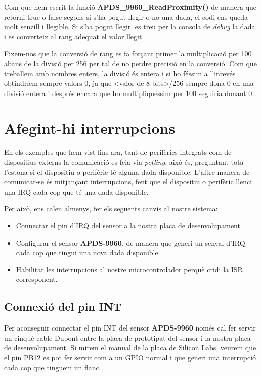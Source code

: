 Com que hem escrit la funció {\bf APDS\_9960\_ReadProximity()} de manera que retorni true o false segons si s'ha pogut llegir o no una dada, el codi ens queda molt senzill i llegible. Si s'ha pogut llegir, es treu per la consola de {\em debug} la dada i es converteix al rang adequat el valor llegit.

\begin{remark}
 Fixem-nos que la conversió de rang es fa forçant primer la multiplicació per 100 abans de la divisió per 256 per tal de no perdre precisió en la conversió. Com que treballem amb nombres enters, la divisió és entera i si ho féssim a l'inrevés obtindríem sempre valors 0, ja que <valor de 8 bits>/256 sempre dona 0 en una divisió entera i després encara que ho multipliquéssim per 100 seguiria donant 0..
\end{remark}


\section{Afegint-hi interrupcions}
\label{sec:full_app_irq}
En els exemples que hem vist fins ara, tant de perifèrics integrats com de dispositius externs la comunicació es feia via {\em polling}, això és, preguntant tota l'estona si el dispositiu o perifèric té alguna dada disponible. L'altre manera de comunicar-se és mitjançant interrupcions, fent que el dispositiu o perifèric llenci una \gls{IRQ} cada cop que té una dada disponible.

Per això, ens calen almenys, fer els següents canvis al nostre sistema:
\begin{itemize}
 \item Connectar el pin d'\gls{IRQ} del sensor a la nostra placa de desenvolupament
 \item Configurar el sensor {\bf APDS-9960}, de manera que generi un senyal d'IRQ cada cop que tingui una nova dada disponible
 \item Habilitar les interrupcions al nostre microcontrolador perquè cridi la \gls{ISR} corresponent.
\end{itemize}

\subsection{Connexió del pin INT}
Per aconseguir connectar el pin INT del sensor {\bf APDS-9960} només cal fer servir un cinquè cable Dupont entre la placa de prototipat del sensor i la nostra placa de desenvolupament. Si mirem el manual de la placa de Silicon Labs, veurem que el pin PB12 es pot fer servir com a un GPIO normal i que generi una interrupció cada cop que tinguem un flanc.

